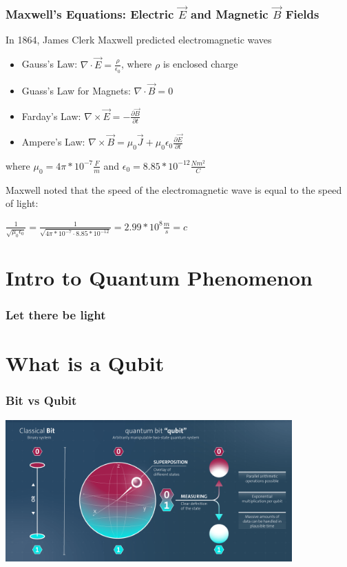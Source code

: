 \documentclass{beamer}
\begin{document}
\begin{frame}\frametitle{Maxwell's Equations: Electric $\vec{E}$ and Magnetic $\vec{B}$ Fields}
In 1864, James Clerk Maxwell predicted electromagnetic waves
\begin{itemize}
\item Gauss's Law: $\nabla \cdot \vec{E} = \frac{\rho}{\epsilon_0}$, where ${\rho}$ is enclosed charge
\item Guass's Law for Magnets: $\nabla \cdot \vec{B} = 0$
\item Farday's Law: $\nabla \times \vec{E} = -\frac{\partial \vec{B}}{\partial t}$
\item Ampere's Law: $\nabla \times \vec{B} = \mu_0 \vec{J} + \mu_0 \epsilon_0 \frac{\partial \vec{E}}{\partial t}$
\end{itemize}

where \newline
$\mu_0 = 4 \pi*10^{-7} \frac{F}{m}$ and 
$\epsilon_0 = 8.85*10^{-12} \frac{N m^2}{C}$ \newline

Maxwell noted that the speed of the electromagnetic wave is equal to the speed of light:


$\frac{1}{\sqrt{\mu_0 \epsilon_0}}= \frac{1}{\sqrt{4 \pi*10^{-7} \cdot 8.85*10^{-12}}} = 2.99*10^{8} \frac{m}{s} = c$
\end{frame}

\section{Intro to Quantum Phenomenon}

\begin{frame}\frametitle{Let there be light}

\end{frame}

\section{What is a Qubit}

\begin{frame} \frametitle{Bit vs Qubit}
\begin{center}
\includegraphics[width=11cm]{fig/bitQubit.png}
\end{center}

\end{frame}
\end{document}
